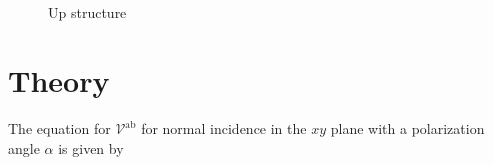\documentclass[prb,11pt,tightenlines,twocolumn,aps]{revtex4-1}
\begin{document}
\begin{figure}[ht!]
    \centering
    \label{fig:up-struc-xz}
    \\
    \label{fig:up-struc-xy}
    \caption{Up structure}
    \label{fig:up-struc}
\end{figure}
\blindtext
\blindtext

\blindtext

\section{Theory} %
\label{sec:theory}
The equation for $\mathcal{V}^{\mathrm{ab}}$ for normal incidence in the $xy$
plane with a polarization angle $\alpha$ is given by
\end{document}

